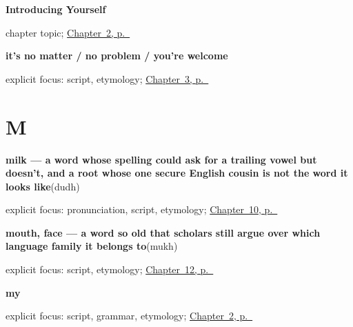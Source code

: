 \noindent\begin{minipage}[t]{\linewidth}
\raggedright
\textbf{Introducing Yourself}\par
\footnotesize chapter topic; \hyperref[ch:introductions]{Chapter~2, p.~\pageref*{ch:introductions}}
\end{minipage}\par\smallskip

\noindent\begin{minipage}[t]{\linewidth}
\raggedright
\textbf{it's no matter / no problem / you're welcome}\enspace\emph{  }\par
\footnotesize explicit focus: script, etymology; \hyperref[ch:responding]{Chapter~3, p.~\pageref*{ch:responding}}
\end{minipage}\par\smallskip

\section*{M}

\noindent\begin{minipage}[t]{\linewidth}
\raggedright
\textbf{milk — a word whose spelling could ask for a trailing vowel but doesn't, and a root whose one secure English cousin is not the word it looks like}\enspace\emph{}\enspace(dudh)\par
\footnotesize explicit focus: pronunciation, script, etymology; \hyperref[ch:bn-tea-water-milk-rice]{Chapter~10, p.~\pageref*{ch:bn-tea-water-milk-rice}}
\end{minipage}\par\smallskip

\noindent\begin{minipage}[t]{\linewidth}
\raggedright
\textbf{mouth, face — a word so old that scholars still argue over which language family it belongs to}\enspace\emph{}\enspace(mukh)\par
\footnotesize explicit focus: script, etymology; \hyperref[ch:bn-eye-mouth-nose-heart]{Chapter~12, p.~\pageref*{ch:bn-eye-mouth-nose-heart}}
\end{minipage}\par\smallskip

\noindent\begin{minipage}[t]{\linewidth}
\raggedright
\textbf{my}\enspace\emph{}\par
\footnotesize explicit focus: script, grammar, etymology; \hyperref[ch:introductions]{Chapter~2, p.~\pageref*{ch:introductions}}
\end{minipage}\par\smallskip

